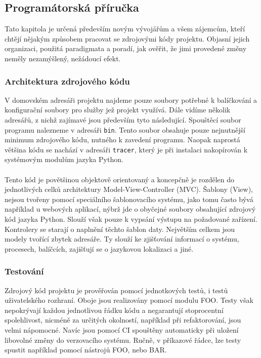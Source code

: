 \documentclass[
  field=inf,
  biblatex,
  glossaries,
  index
]{kidiplom}
\begin{document}
	\subsection{Programátorská příručka}
	Tato kapitola je určená především novým vývojářům a všem zájemcům, kteří chtějí nějakým způsobem pracovat se zdrojovými kódy projektu. Objasní jejich organizaci, použitá paradigmata a poradí, jak ověřit, že jimi provedené změny neměly nezamýšlený, nežádoucí efekt.

		\subsubsection{Architektura zdrojového kódu}
		V domovském adresáři projektu najdeme pouze soubory potřebné k balíčkování a konfigurační soubory pro služby jež projekt využívá. Dále vidíme několik adresářů, z nichž zajímavé jsou především tyto následující. Spouštěcí soubor programu nalezneme v adresáři \texttt{bin}. Tento soubor obsahuje pouze nejnutnější minimum zdrojového kódu, nutného k zavedení programu. Naopak naprostá většina kódu se nachází v adresáři \texttt{tracer}, který je při instalaci nakopírován k systémovým modulům jazyka Python.
		\\
		\\
		Tento kód je povětšinou objektově orientovaný a koncepčně je rozdělen do jednotlivých celků architektury Model-View-Controller (MVC). Šablony (View), nejsou tvořeny pomocí speciálního šablonovacího systému, jako tomu často bývá například u webových aplikací, nýbrž jde o obyčejné soubory obsahující zdrojový kód jazyka Python. Slouží však pouze k vypsání výstupu na požadované zařízení. Kontrolery se starají o naplnění těchto šablon  daty. Největším celkem jsou modely tvořící zbytek adresáře. Ty slouží ke zjišťování informací o systému, procesech, balíčcích, zajišťují se o jazykovou lokalizaci a jiné.

		\subsubsection{Testování}
		Zdrojový kód projektu je prověřován pomocí jednotkových testů, i testů uživatelského rozhraní. Oboje jsou realizovány pomocí modulu FOO. Testy však nepokrývají každou jednotlivou řádku kódu a negarantují stoprocentní spolehlivost, nicméně za určitých okolností, například při refaktorování, jsou velmi nápomocné. Navíc jsou pomocí CI spouštěny automaticky při uložení libovolné změny do verzovacího systému. Ručně, v příkazové řádce, lze testy spustit například pomocí nástrojů FOO, nebo BAR.
\end{document}
